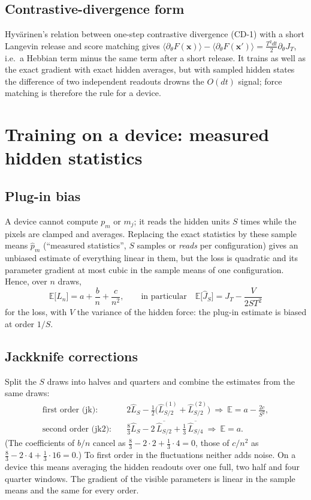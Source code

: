 \documentclass[11pt,a4paper]{article}
\newcommand{\vx}{\bm{x}}
\newcommand{\E}{\mathbb{E}}
\begin{document}
\subsection{Contrastive-divergence form}
Hyv\"arinen's relation between one-step contrastive divergence (CD-1) with a short Langevin release and score
matching gives $\langle\partial_\theta F(\vx)\rangle-\langle\partial_\theta F(\vx')\rangle=\tfrac{T^2dt}{2}\partial_\theta J_T$,
i.e.\ a Hebbian term minus the same term after a short release. It trains as well as the exact gradient with exact
hidden averages, but with sampled hidden states the difference of two independent readouts drowns the $O(dt)$
signal; force matching is therefore the rule for a device.

\section{Training on a device: measured hidden statistics}\label{sec:measured}

\subsection{Plug-in bias}
A device cannot compute $p_m$ or $m_j$; it reads the hidden units $S$ times while the pixels are clamped and
averages. Replacing the exact statistics by these sample means $\hat p_m$ (``measured statistics'', $S$ samples or
\emph{reads} per configuration) gives an unbiased estimate of everything linear in them, but the loss is quadratic
and its parameter gradient at most cubic in the sample means of one configuration. Hence, over $n$ draws,
\begin{equation}
  \E\big[\hat L_n\big]=a+\frac bn+\frac c{n^2},\qquad\text{in particular}\quad \E\big[\hat J_S\big]=J_T-\frac{V}{2ST^2}
\end{equation}
for the loss, with $V$ the variance of the hidden force: the plug-in estimate is biased at order $1/S$.

\subsection{Jackknife corrections}
Split the $S$ draws into halves and quarters and combine the estimates from the same draws:
\begin{align}
  \text{first order (jk):}\quad&2\hat L_S-\tfrac12\big(\hat L_{S/2}^{(1)}+\hat L_{S/2}^{(2)}\big)
     \ \Rightarrow\ \E=a-\frac{2c}{S^2},\\
  \text{second order (jk2):}\quad&\tfrac83\hat L_S-2\,\overline{\hat L_{S/2}}+\tfrac13\,\overline{\hat L_{S/4}}
     \ \Rightarrow\ \E=a .
\end{align}
(The coefficients of $b/n$ cancel as $\tfrac83-2\cdot2+\tfrac13\cdot4=0$, those of $c/n^2$ as
$\tfrac83-2\cdot4+\tfrac13\cdot16=0$.) To first order in the fluctuations neither adds noise. On a device this means
averaging the hidden readouts over one full, two half and four quarter windows. The gradient of the visible
parameters is linear in the sample means and the same for every order.
\end{document}
